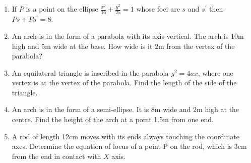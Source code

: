 \begin{enumerate}[label=\thesubsection.\arabic*,ref=\thesubsection.\theenumi]
\item If ${P}$ is a point on the ellipse $\frac{x^2}{16}+\frac{y^2}{25}=1$ whose foci  are $s$ and $s^{\prime}$ then $Ps +Ps^{\prime}=8$.
\item An arch is in the form of a parabola with its axis vertical. The arch is 10m high and 5m wide at the base. How wide is it 2m from the vertex of the parabola?
\label{chapters/11/11/5/2}
\item An equilateral triangle is inscribed in the parabola $y^{2} = 4ax$, where one vertex is at the vertex of the parabola. Find the length of the side of the triangle.
\label{chapters/11/11/5/8}
\item An arch is in the form of a semi-ellipse. It is 8m wide and 2m high at the centre. Find the height of the arch at a point 1.5m from one end.
\label{chapters/11/11/5/4}
\item A rod of length 12cm moves with its ends always touching the coordinate axes. Determine the equation of locus of a point  P on the rod, which is 3cm from the end in contact with $X$ axis.
\label{chapters/11/11/5/5}
\end{enumerate}
